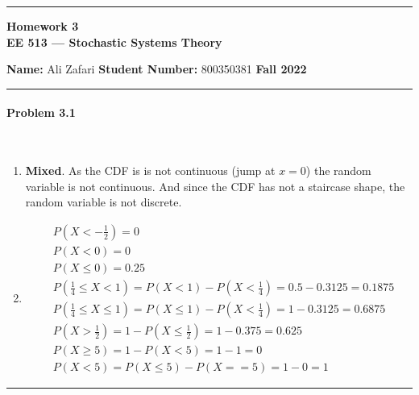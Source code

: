 \documentclass[12pt, letterpaper]{scrartcl}
\begin{document}
    \begin{center}
    	\hrule
    	\vspace{0.4cm}
    	{\textbf { {\large Homework 3} \\ EE 513 --- Stochastic Systems Theory}}
    \end{center}
    { \textbf{Name:} Ali Zafari \hspace{\fill} \textbf{Student Number:} 800350381 \hspace{\fill} \textbf{Fall 2022} } \newline\hrule


\paragraph*{Problem 3.1} \hfill\\
\begin{enumerate}[((a))]
    \item \textbf{Mixed}. As the CDF is is not continuous (jump at $x=0$) the random variable is not continuous. And since the CDF has not a staircase shape, the random variable is not discrete.
    \item
    \begin{align*}
        &P(X<-\frac{1}{2})=0\\
        &P(X<0)=0\\
        &P(X\leq0)=0.25\\
        &P(\frac{1}{4}\leq X<1)=P(X<1)-P(X<\frac{1}{4})=0.5-0.3125=0.1875\\
        &P(\frac{1}{4}\leq X\leq1)=P(X\leq1)-P(X<\frac{1}{4})=1-0.3125=0.6875\\
        &P(X>\frac{1}{2})=1-P(X\leq\frac{1}{2})=1-0.375=0.625\\
        &P(X\geq5)=1-P(X<5)=1-1=0\\
        &P(X<5)=P(X\leq5)-P(X==5)=1-0=1
    \end{align*}
\end{enumerate}
\hrule
\end{document}
